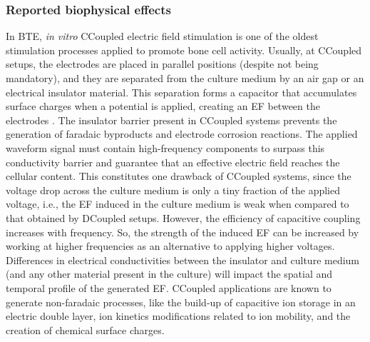 \subsubsection{Reported biophysical effects}
In \ac{BTE}, \textit{in vitro} \ac{CCoupled} electric field stimulation is one of the oldest stimulation processes applied to promote bone cell activity. Usually, at \ac{CCoupled} setups, the electrodes are placed in parallel positions (despite not being mandatory), and they are separated from the culture medium by an air gap or an electrical insulator material. This separation forms a capacitor that accumulates surface charges when a potential is applied, creating an \ac{EF} between the electrodes \cite{Thrivikraman2018-su}. The insulator barrier present in \ac{CCoupled} systems prevents the generation of faradaic byproducts and electrode corrosion reactions. The applied waveform signal must contain high-frequency components to surpass this conductivity barrier and guarantee that an effective electric field reaches the cellular content. This constitutes one drawback of \ac{CCoupled} systems, since the voltage drop across the culture medium is only a tiny fraction of the applied voltage, i.e., the \ac{EF} induced in the culture medium is weak when compared to that obtained by \ac{DCoupled} setups. However, the efficiency of capacitive coupling increases with frequency. So, the strength of the induced \ac{EF} can be increased by working at higher frequencies as an alternative to applying higher voltages. Differences in electrical conductivities between the insulator and culture medium (and any other material present in the culture) will impact the spatial and temporal profile of the generated \ac{EF}. \ac{CCoupled} applications are known to generate non-faradaic processes, like the build-up of capacitive ion storage in an electric double layer, ion kinetics modifications related to ion mobility, and the creation of chemical surface charges.

